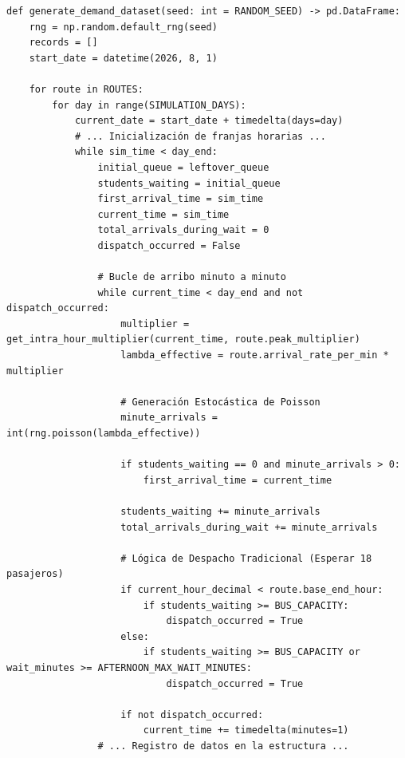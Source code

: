 \documentclass[12pt,letterpaper]{article}
\begin{document}
\begin{lstlisting}[caption={Fragmento Clave de src/data\_generator.py}]
def generate_demand_dataset(seed: int = RANDOM_SEED) -> pd.DataFrame:
    rng = np.random.default_rng(seed)
    records = []
    start_date = datetime(2026, 8, 1)
    
    for route in ROUTES:
        for day in range(SIMULATION_DAYS):
            current_date = start_date + timedelta(days=day)
            # ... Inicialización de franjas horarias ...
            while sim_time < day_end:
                initial_queue = leftover_queue
                students_waiting = initial_queue
                first_arrival_time = sim_time
                current_time = sim_time
                total_arrivals_during_wait = 0
                dispatch_occurred = False
                
                # Bucle de arribo minuto a minuto
                while current_time < day_end and not dispatch_occurred:
                    multiplier = get_intra_hour_multiplier(current_time, route.peak_multiplier)
                    lambda_effective = route.arrival_rate_per_min * multiplier
                    
                    # Generación Estocástica de Poisson
                    minute_arrivals = int(rng.poisson(lambda_effective))
                    
                    if students_waiting == 0 and minute_arrivals > 0:
                        first_arrival_time = current_time
                    
                    students_waiting += minute_arrivals
                    total_arrivals_during_wait += minute_arrivals
                    
                    # Lógica de Despacho Tradicional (Esperar 18 pasajeros)
                    if current_hour_decimal < route.base_end_hour:
                        if students_waiting >= BUS_CAPACITY:
                            dispatch_occurred = True
                    else:
                        if students_waiting >= BUS_CAPACITY or wait_minutes >= AFTERNOON_MAX_WAIT_MINUTES:
                            dispatch_occurred = True
                    
                    if not dispatch_occurred:
                        current_time += timedelta(minutes=1)
                # ... Registro de datos en la estructura ...
\end{lstlisting}
\end{document}
